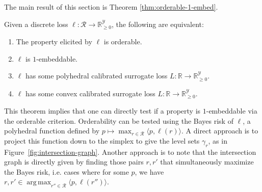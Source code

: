 \documentclass[anon]{colt2020} %
\newcommand{\reals}{\mathbb{R}}
\newcommand{\nonnegreals}{\reals_{\geq 0}}%
\newcommand{\R}{\mathcal{R}}
\newcommand{\Y}{\mathcal{Y}}
\newcommand{\inprod}[2]{\langle #1, #2 \rangle}%
\DeclareMathOperator*{\argmax}{arg\,max}
\begin{document}
The main result of this section is Theorem \ref{thm:orderable-1-embed}.
\begin{theorem} \label{thm:orderable-1-embed}
  Given a discrete loss $\ell: \R \to \nonnegreals^{\Y}$, the following are equivalent:
  \begin{enumerate}
    \item The property elicited by $\ell$ is orderable.
    \item $\ell$ is $1$-embeddable.
    \item $\ell$ has some polyhedral calibrated surrogate loss $L: \reals \to \nonnegreals^{\Y}$.
    \item $\ell$ has some convex calibrated surrogate loss $L: \reals \to \nonnegreals^{\Y}$.
  \end{enumerate}
\end{theorem}
This theorem implies that one can directly test if a property is $1$-embeddable via the orderable criterion.
Orderability can be tested using the Bayes risk of $\ell$, a polyhedral function defined by $p \mapsto \max_{r \in \R} \inprod{p}{\ell(r)}$.
A direct approach is to project this function down to the simplex to give the level sets $\gamma_r$, as in Figure~\ref{fig:intersection-graph}.
Another approach is to note that the intersection graph is directly given by finding those pairs $r,r'$ that simultaneously maximize the Bayes risk, i.e. cases where for some $p$, we have $r,r' \in \argmax_{r'' \in \R} \inprod{p}{\ell(r'')}$.
\end{document}
